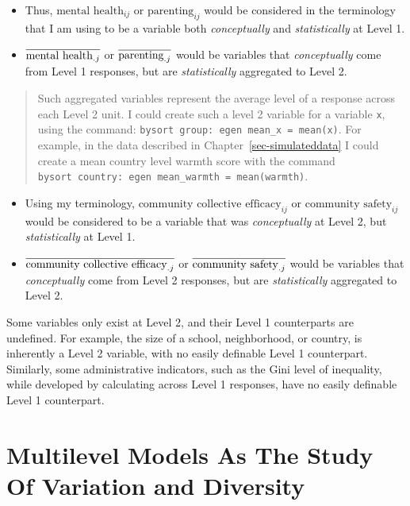 \documentclass[
  letterpaper,
  DIV=11,
  numbers=noendperiod]{scrreprt}
\begin{document}
\begin{itemize}
\item
  Thus, \(\text{mental health}_{ij}\) or \(\text{parenting}_{ij}\) would
  be considered in the terminology that I am using to be a variable both
  \emph{conceptually} and \emph{statistically} at Level 1.
\item
  \(\color{black}\overline{\text{mental health}_{.j}}\) or
  \(\color{black}\overline{\text{parenting}_{.j}}\) would be variables
  that \emph{conceptually} come from Level 1 responses, but are
  \emph{statistically} aggregated to Level 2.
\end{itemize}

\begin{quote}
Such aggregated variables represent the average level of a response
across each Level 2 unit. I could create such a level 2 variable for a
variable \texttt{x}, using the command:
\texttt{bysort\ group:\ egen\ mean\_x\ =\ mean(x)}. For example, in the
data described in Chapter~\ref{sec-simulateddata} I could create a mean
country level warmth score with the command
\texttt{bysort\ country:\ egen\ mean\_warmth\ =\ mean(warmth)}.
\end{quote}

\begin{itemize}
\item
  Using my terminology, \(\text{community collective efficacy}_{ij}\) or
  \(\text{community safety}_{ij}\) would be considered to be a variable
  that was \emph{conceptually} at Level 2, but \emph{statistically} at
  Level 1.
\item
  \(\color{black}\overline{\text{community collective efficacy}_{.j}}\)
  or \(\color{black}\overline{\text{community safety}_{.j}}\) would be
  variables that \emph{conceptually} come from Level 2 responses, but
  are \emph{statistically} aggregated to Level 2.
\end{itemize}

Some variables only exist at Level 2, and their Level 1 counterparts are
undefined. For example, the size of a school, neighborhood, or country,
is inherently a Level 2 variable, with no easily definable Level 1
counterpart. Similarly, some administrative indicators, such as the Gini
level of inequality, while developed by calculating across Level 1
responses, have no easily definable Level 1 counterpart.

\hypertarget{sec-studyvariation}{%
\section{Multilevel Models As The Study Of Variation and
Diversity}\label{sec-studyvariation}}
\end{document}
